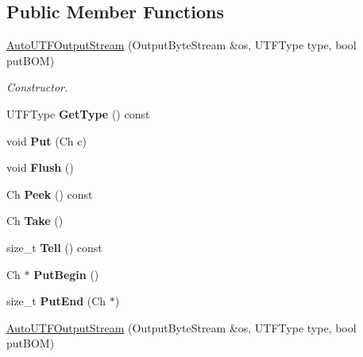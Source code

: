 \subsection*{Public Member Functions}
\begin{DoxyCompactItemize}
\item 
\hyperlink{classAutoUTFOutputStream_a2fe7dbc8e43d11295f66df5653148137}{Auto\+U\+T\+F\+Output\+Stream} (Output\+Byte\+Stream \&os, U\+T\+F\+Type type, bool put\+B\+OM)
\begin{DoxyCompactList}\small\item\em Constructor. \end{DoxyCompactList}\item 
\mbox{\label{classAutoUTFOutputStream_a62091565a8103d69002be2e2f4f0ba2c}} 
U\+T\+F\+Type {\bfseries Get\+Type} () const
\item 
\mbox{\label{classAutoUTFOutputStream_ad12b33e48c45bdbf2628fd3d5461041a}} 
void {\bfseries Put} (Ch c)
\item 
\mbox{\label{classAutoUTFOutputStream_a38b54c84ba0c479552256ac092529f47}} 
void {\bfseries Flush} ()
\item 
\mbox{\label{classAutoUTFOutputStream_ad706f62fd5d22967e5949f3a05087e4e}} 
Ch {\bfseries Peek} () const
\item 
\mbox{\label{classAutoUTFOutputStream_a44ee7d84ba13fece17574d01b7be574b}} 
Ch {\bfseries Take} ()
\item 
\mbox{\label{classAutoUTFOutputStream_a81acbe33d84a28b7d5040d576ae22b5a}} 
size\+\_\+t {\bfseries Tell} () const
\item 
\mbox{\label{classAutoUTFOutputStream_a3c7333661dba3d2210f0b287bdd6c1f3}} 
Ch $\ast$ {\bfseries Put\+Begin} ()
\item 
\mbox{\label{classAutoUTFOutputStream_a4b16bda191526c894501fce447e95b8d}} 
size\+\_\+t {\bfseries Put\+End} (Ch $\ast$)
\item 
\hyperlink{classAutoUTFOutputStream_a2fe7dbc8e43d11295f66df5653148137}{Auto\+U\+T\+F\+Output\+Stream} (Output\+Byte\+Stream \&os, U\+T\+F\+Type type, bool put\+B\+OM)

\end{DoxyCompactItemize}

